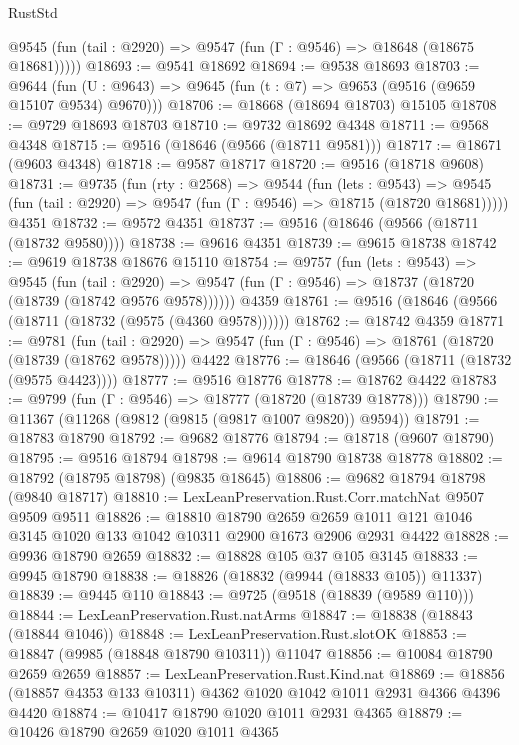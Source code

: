 \begin{lexlean}{RustStd}
\begin{coremodule}
      @9545 (fun (tail : @2920) => @9547 (fun (Γ : @9546) => @18648 (@18675 @18681)))))
@18693 := @9541 @18692
@18694 := @9538 @18693
@18703 := @9644
    (fun (U : @9643) => @9645 (fun (t : @7) => @9653 (@9516 (@9659 @15107 @9534) @9670)))
@18706 := @18668 (@18694 @18703) @15105
@18708 := @9729 @18693 @18703
@18710 := @9732 @18692 @4348
@18711 := @9568 @4348
@18715 := @9516 (@18646 (@9566 (@18711 @9581)))
@18717 := @18671 (@9603 @4348)
@18718 := @9587 @18717
@18720 := @9516 (@18718 @9608)
@18731 := @9735
    (fun (rty : @2568) =>
    @9544
      (fun (lets : @9543) =>
      @9545 (fun (tail : @2920) => @9547 (fun (Γ : @9546) => @18715 (@18720 @18681)))))
    @4351
@18732 := @9572 @4351
@18737 := @9516 (@18646 (@9566 (@18711 (@18732 @9580))))
@18738 := @9616 @4351
@18739 := @9615 @18738
@18742 := @9619 @18738 @18676 @15110
@18754 := @9757
    (fun (lets : @9543) =>
    @9545
      (fun (tail : @2920) =>
      @9547 (fun (Γ : @9546) => @18737 (@18720 (@18739 (@18742 @9576 @9578))))))
    @4359
@18761 := @9516 (@18646 (@9566 (@18711 (@18732 (@9575 (@4360 @9578))))))
@18762 := @18742 @4359
@18771 := @9781
    (fun (tail : @2920) => @9547 (fun (Γ : @9546) => @18761 (@18720 (@18739 (@18762 @9578)))))
    @4422
@18776 := @18646 (@9566 (@18711 (@18732 (@9575 @4423))))
@18777 := @9516 @18776
@18778 := @18762 @4422
@18783 := @9799 (fun (Γ : @9546) => @18777 (@18720 (@18739 @18778)))
@18790 := @11367 (@11268 (@9812 (@9815 (@9817 @1007 @9820)) @9594))
@18791 := @18783 @18790
@18792 := @9682 @18776
@18794 := @18718 (@9607 @18790)
@18795 := @9516 @18794
@18798 := @9614 @18790 @18738 @18778
@18802 := @18792 (@18795 @18798) (@9835 @18645)
@18806 := @9682 @18794 @18798 (@9840 @18717)
@18810 := LexLeanPreservation.Rust.Corr.matchNat @9507 @9509 @9511
@18826 := @18810
    @18790
    @2659
    @2659
    @1011
    @121
    @1046
    @3145
    @1020
    @133
    @1042
    @10311
    @2900
    @1673
    @2906
    @2931
    @4422
@18828 := @9936 @18790 @2659
@18832 := @18828 @105 @37 @105 @3145
@18833 := @9945 @18790
@18838 := @18826 (@18832 (@9944 (@18833 @105)) @11337)
@18839 := @9445 @110
@18843 := @9725 (@9518 (@18839 (@9589 @110)))
@18844 := LexLeanPreservation.Rust.natArms
@18847 := @18838 (@18843 (@18844 @1046))
@18848 := LexLeanPreservation.Rust.slotOK
@18853 := @18847 (@9985 (@18848 @18790 @10311)) @11047
@18856 := @10084 @18790 @2659 @2659
@18857 := LexLeanPreservation.Rust.Kind.nat
@18869 := @18856 (@18857 @4353 @133 @10311) @4362 @1020 @1042 @1011 @2931 @4366 @4396 @4420
@18874 := @10417 @18790 @1020 @1011 @2931 @4365
@18879 := @10426 @18790 @2659 @1020 @1011 @4365

\end{coremodule}
\end{lexlean}
